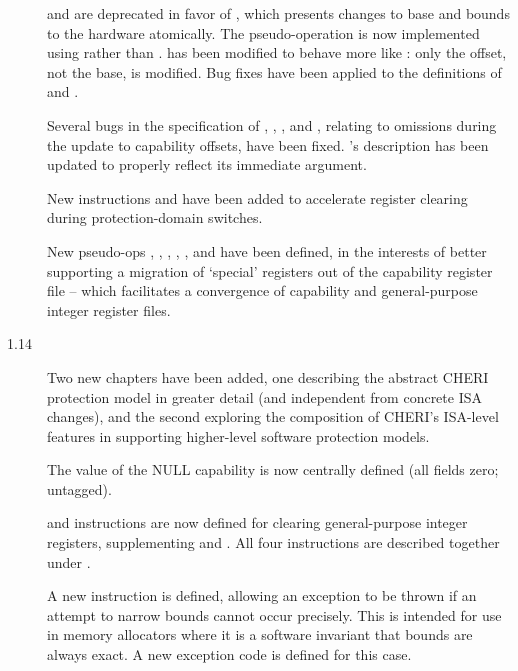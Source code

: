 \begin{description}
   and  are deprecated in favor
  of , which presents changes to base and bounds to
  the hardware atomically.
  The  pseudo-operation is now implemented using
   rather than .
   has been modified to behave more like
  : only the offset, not the base, is modified.
  Bug fixes have been applied to the definitions of 
  and .

  Several bugs in the specification of , ,
  , and , relating to omissions
  during the update to capability offsets, have been fixed.
  's description has been updated to properly reflect its
  immediate argument.

  New instructions  and  have
  been added to accelerate register clearing during protection-domain
  switches.

  New pseudo-ops , ,
  , , , and
   have been defined, in the interests of better
  supporting a migration of `special' registers out of the capability register
  file -- which facilitates a convergence of capability and general-purpose
  integer register files.

\item[1.14]
  Two new chapters have been added, one describing the abstract CHERI
  protection model in greater detail (and independent from concrete ISA
  changes), and the second exploring the composition of CHERI's ISA-level
  features in supporting higher-level software protection models.

  The value of the NULL capability is now centrally defined (all fields zero;
  untagged).

   and  instructions are now
  defined for clearing general-purpose integer registers, supplementing
   and .
  All four instructions are described together under .

  A new  instruction is defined, allowing an
  exception to be thrown if an attempt to narrow bounds cannot occur
  precisely.
  This is intended for use in memory allocators where it is a software
  invariant that bounds are always exact.
  A new exception code is defined for this case.


\end{description}
